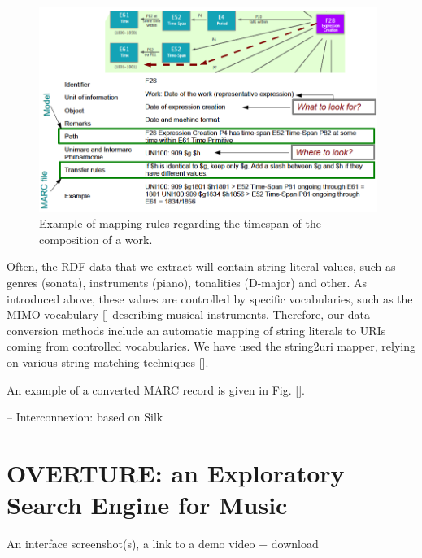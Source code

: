 \documentclass[runningheads,a4paper]{llncs}
\begin{document}
\begin{figure}
  \centering
  \includegraphics[width=11cm]{img/mapping-rules.png}
  \caption{Example of mapping rules regarding the timespan of the composition of a work.}
  \label{fig:mappings}
\end{figure}

Often, the RDF data that we extract will contain string literal values, such as genres (sonata), instruments (piano), tonalities (D-major) and other. As introduced above, these values are controlled by specific vocabularies, such as the MIMO vocabulary \ref{} describing musical instruments. Therefore, our data conversion methods include an automatic mapping of string literals to URIs coming from controlled vocabularies. We have used the string2uri mapper, relying on various string matching techniques \ref{}.

An example of a converted MARC record is given in Fig. \ref{}.

-- Interconnexion: based on Silk


\section{OVERTURE: an Exploratory Search Engine for Music}
\label{sec:overture}
An interface screenshot(s), a link to a demo video + download

\end{document}
